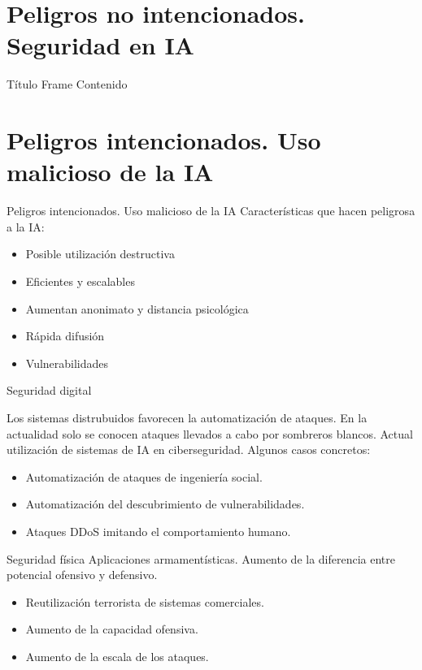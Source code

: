 \documentclass{beamer}
\begin{document}
\section{Peligros no intencionados. Seguridad en IA}
\begin{frame}{Título Frame}
Contenido
\end{frame}

\section{Peligros intencionados. Uso malicioso de la IA}
\begin{frame}{Peligros intencionados. Uso malicioso de la IA}
Características que hacen peligrosa a la IA:

\begin{itemize}
\item Posible utilización destructiva
\item Eficientes y escalables
\item Aumentan anonimato y distancia psicológica
\item Rápida difusión
\item Vulnerabilidades
\end{itemize}

\end{frame}

\begin{frame}{Seguridad digital}

Los sistemas distrubuidos favorecen la automatización de ataques.
\newline
\newline
En la actualidad solo se conocen ataques llevados a cabo por sombreros blancos.
\newline
\newline
Actual utilización de sistemas de IA en ciberseguridad.
\newline
\newline
Algunos casos concretos:
\begin{itemize}
\item Automatización de ataques de ingeniería social.
\item Automatización del descubrimiento de vulnerabilidades.
\item Ataques DDoS imitando el comportamiento humano.
\end{itemize}

\end{frame}

\begin{frame}{Seguridad física}
Aplicaciones armamentísticas.
\newline
\newline
Aumento de la diferencia entre potencial ofensivo y defensivo.
\newline
\newline
\begin{itemize}
\item Reutilización terrorista de sistemas comerciales.
\item Aumento de la capacidad ofensiva.
\item Aumento de la escala de los ataques.
\end{itemize}
\end{frame}
\end{document}
